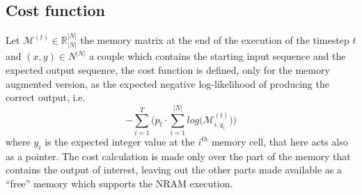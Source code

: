 \subsection{Cost function}\label{subsec:cost-function}
Let $\mathcal{M}^{(t)} \in \mathbb{R}^{|N|}_{|N|}$ the memory matrix at the end of the execution of the timestep $t$ and $(x, y) \in N^{|N|}$ a couple which contains the starting input sequence and the expected output sequence, the cost function is defined, only for the memory augmented version, as the expected negative log-likelihood of producing the correct output, i.e.
\begin{equation}
	-\sum\limits_{i=1}^{T}\Bigg(p_{t}\cdot\sum\limits_{i=1}^{|N|}log\Big(\mathcal{M}_{i, y_{i}}^{(t)}\Big)\Bigg)
\end{equation}
where $y_i$ is the expected integer value at the $i^{th}$ memory cell, that here acts also as a pointer. The cost calculation is made only over the part of the memory that contains the output of interest, leaving out the other parts made available as a ``free'' memory which supports the NRAM execution.